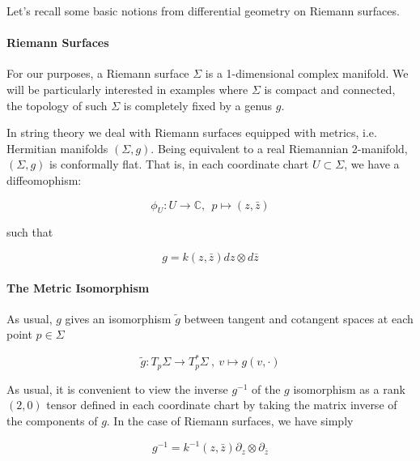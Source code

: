 Let's recall some basic notions from differential geometry on Riemann surfaces.

\paragraph{Riemann Surfaces}

    For our purposes, a Riemann surface $\Sigma$ is a 1-dimensional complex manifold.  We will be particularly interested in examples where $\Sigma$ is compact and connected, the topology of such $\Sigma$ is completely fixed by a genus $g$.

    In string theory we deal with Riemann surfaces equipped with metrics, i.e. Hermitian manifolds $(\Sigma, g)$. Being equivalent to a real Riemannian 2-manifold,  $(\Sigma, g)$ is conformally flat. That is, in each coordinate chart $U \subset \Sigma$, we have a diffeomophism:

    \begin{equation}
        \phi_U: U \to \mathbb C, ~~
        p \mapsto (z, \bar z)
    \end{equation}

    such that

    \begin{equation}
        g = k(z, \bar z) dz \otimes d\bar z
        \label{eq:riemann-surface-metric}
    \end{equation}

\paragraph{The Metric Isomorphism}

    As usual, $g$ gives an isomorphism $\tilde g$ between tangent and cotangent spaces at each point $p \in \Sigma$

        \begin{equation}
            \tilde g: T_p\Sigma \to T_p^*\Sigma ~,~ v \mapsto g(v, \cdot)
        \end{equation}

    As usual, it is convenient to view the inverse $g^{-1}$ of the $ g$ isomorphism as a rank $(2, 0)$ tensor defined in each coordinate chart by taking the matrix inverse of the components of $g$. In the case of Riemann surfaces, we have simply

        \begin{equation}
            g^{-1} = k^{-1}(z, \bar z) \partial_z \otimes \partial_{\bar z}
            \label{eq:2d-metric-inverse}
        \end{equation}


